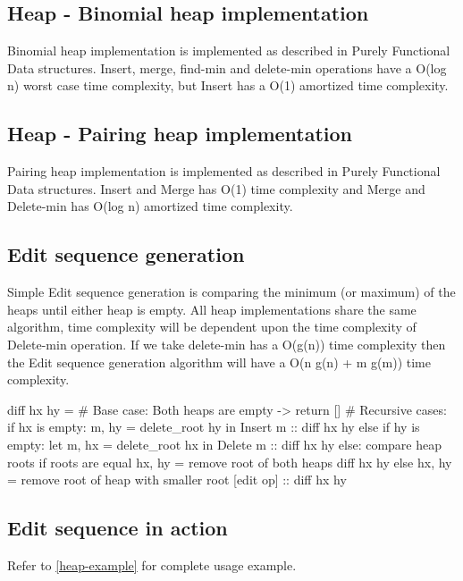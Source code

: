 \documentclass{article}
\begin{document}
\subsection{Heap - Binomial heap implementation}
Binomial heap implementation is implemented as described in Purely Functional Data structures\cite{okasaki1999purely}. 
Insert, merge, find-min and delete-min operations have a O(log n) worst case time complexity, 
but Insert has a O(1) amortized time complexity.

\subsection{Heap - Pairing heap implementation}
Pairing heap implementation is implemented as described in Purely Functional Data structures\cite{okasaki1999purely}. 
Insert and Merge has O(1) time complexity and Merge and Delete-min has O(log n) amortized time complexity.

\subsection{Edit sequence generation}
Simple Edit sequence generation is comparing the minimum (or maximum) of the heaps until either heap is empty. 
All heap implementations share the same algorithm, time complexity will be dependent upon the time complexity of 
Delete-min operation. If we take delete-min has a O(g(n)) time complexity then the Edit sequence generation 
algorithm will have a O(n g(n) + m g(m)) time complexity.

\begin{longlisting}[python]
diff hx hy =
  # Base case:
  	Both heaps are empty -> return []
  # Recursive cases:
  	if hx is empty:
      m, hy = delete_root hy in
      Insert m :: diff hx hy
  	else if hy is empty:
      let m, hx = delete_root hx in
      Delete m :: diff hx hy
  	else:
      compare heap roots
      if roots are equal
      	hx, hy = remove root of both heaps
        diff hx hy
      else
      	hx, hy = remove root of heap with smaller root
        [edit op] :: diff hx hy
\end{longlisting}

\subsection{Edit sequence in action}
Refer to \ref{heap-example} for complete usage example.
\end{document}
